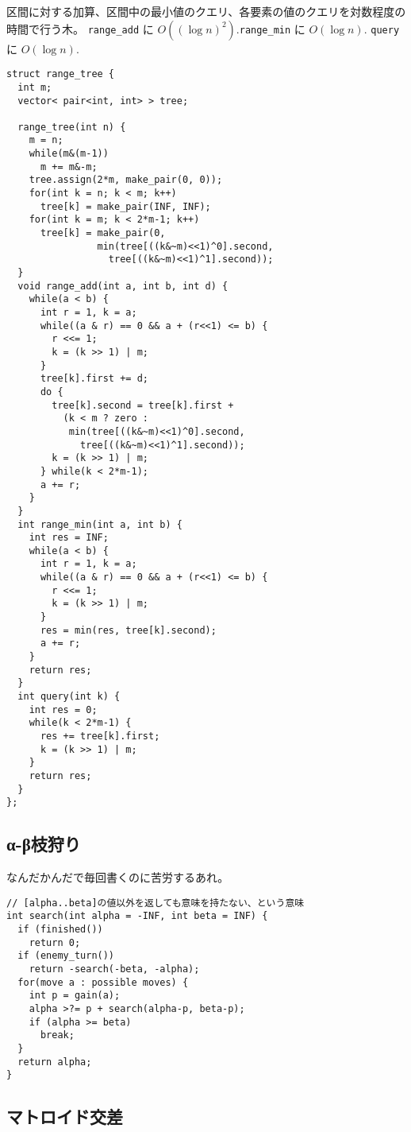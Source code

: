 区間に対する加算、区間中の最小値のクエリ、各要素の値のクエリを対数程度の時間で行う木。
\verb|range_add| に $O((\log n)^2)$.\verb|range_min| に $O(\log n)$.
\verb|query| に $O(\log n)$.

\begin{lstlisting}
struct range_tree {
  int m;
  vector< pair<int, int> > tree;

  range_tree(int n) {
    m = n;
    while(m&(m-1))
      m += m&-m;
    tree.assign(2*m, make_pair(0, 0));
    for(int k = n; k < m; k++)
      tree[k] = make_pair(INF, INF);
    for(int k = m; k < 2*m-1; k++)
      tree[k] = make_pair(0,
                min(tree[((k&~m)<<1)^0].second,
                  tree[((k&~m)<<1)^1].second));
  }
  void range_add(int a, int b, int d) {
    while(a < b) {
      int r = 1, k = a;
      while((a & r) == 0 && a + (r<<1) <= b) {
        r <<= 1;
        k = (k >> 1) | m;
      }
      tree[k].first += d;
      do {
        tree[k].second = tree[k].first +
          (k < m ? zero :
           min(tree[((k&~m)<<1)^0].second,
             tree[((k&~m)<<1)^1].second));
        k = (k >> 1) | m;
      } while(k < 2*m-1);
      a += r;
    }
  }
  int range_min(int a, int b) {
    int res = INF;
    while(a < b) {
      int r = 1, k = a;
      while((a & r) == 0 && a + (r<<1) <= b) {
        r <<= 1;
        k = (k >> 1) | m;
      }
      res = min(res, tree[k].second);
      a += r;
    }
    return res;
  }
  int query(int k) {
    int res = 0;
    while(k < 2*m-1) {
      res += tree[k].first;
      k = (k >> 1) | m;
    }
    return res;
  }
};
\end{lstlisting}



\subsection{α-β枝狩り}

なんだかんだで毎回書くのに苦労するあれ。

\begin{lstlisting}
// [alpha..beta]の値以外を返しても意味を持たない、という意味
int search(int alpha = -INF, int beta = INF) {
  if (finished())
    return 0;
  if (enemy_turn())
    return -search(-beta, -alpha);
  for(move a : possible moves) {
    int p = gain(a);
    alpha >?= p + search(alpha-p, beta-p);
    if (alpha >= beta)
      break;
  }
  return alpha;
}
\end{lstlisting}



\subsection{マトロイド交差}

